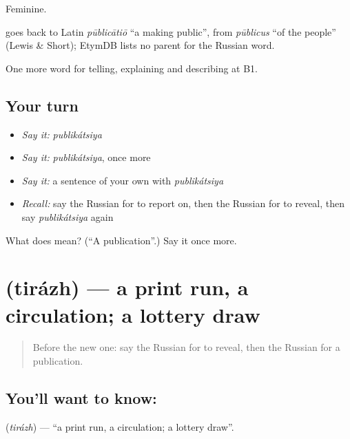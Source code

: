 Feminine.

\begin{cousinweb}
\emph{} goes back to Latin \emph{pūblicātiō} \textquotedblleft{}a making public\textquotedblright{}, from \emph{pūblicus} \textquotedblleft{}of the people\textquotedblright{} (Lewis \& Short); EtymDB lists no parent for the Russian word.
\end{cousinweb}

\begin{grammarlens}[title={What you've built}]
One more word for telling, explaining and describing at B1.
\end{grammarlens}

\subsection*{Your turn}
\begin{itemize}
\raggedright
  \item \emph{Say it:} \emph{publikátsiya}
  \item \emph{Say it:} \emph{publikátsiya}, once more
  \item \emph{Say it:} a sentence of your own with \emph{publikátsiya}
  \item \emph{Recall:} say the Russian for to report on, then the Russian for to reveal, then say \emph{publikátsiya} again
\end{itemize}

\begin{tcolorbox}[breakable,colback=teal!4,colframe=teal!35!black,title={Before you move on}]
What does  mean? (\textquotedblleft{}A publication\textquotedblright{}.) Say it once more.
\end{tcolorbox}
\section[\texorpdfstring{\ru{тираж} (tirázh)}{тираж (tirázh)}]{ (tirázh) — a print run, a circulation; a lottery draw}

\label{lesson:RU-C286-tirazh}



\begin{quote}
Before the new one: say the Russian for to reveal, then the Russian for a publication.
\end{quote}

\subsection*{You'll want to know: }
\textbf{} (\emph{tirázh}) — \textquotedblleft{}a print run, a circulation; a lottery draw\textquotedblright{}.

